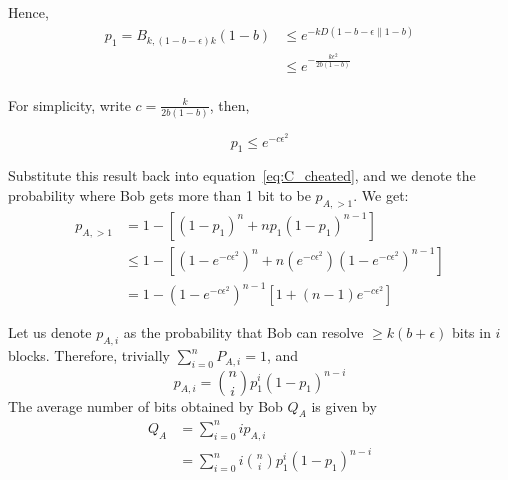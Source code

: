 \documentclass[%
 reprint,
superscriptaddress,
 amsmath,amssymb,
 aps,
]{revtex4-2}
\begin{document}
Hence, 
\begin{equation}
\begin{split}
p_1=B_{k, (1-b-\epsilon)k}(1-b)&\le e^{-kD\left(1-b-\epsilon\|1-b\right)}\\
&\le e^{-\frac{k\epsilon^2}{2b(1-b)}}\\
\end{split}
\end{equation}

For simplicity, write $c=\frac{k}{2b(1-b)}$, then,

\begin{equation}
    p_1\le  e^{-c\epsilon^2}
\end{equation}

Substitute this result back into equation~\ref{eq:C_cheated}, and we denote the probability where Bob gets more than 1 bit to be $p_{A, >1}$. We get:
\begin{equation}
    \begin{split}
        p_{A, >1} &=1-\left[(1-p_1)^n+np_1(1-p_1)^{n-1}\right]\\
        &\le 1-\left[(1-e^{-c\epsilon^2})^n+n(e^{-c\epsilon^2})(1-e^{-c\epsilon^2})^{n-1}\right]\\
        &=1-(1-e^{-c\epsilon^2})^{n-1}\left[1+(n-1)e^{-c\epsilon^2}\right]
    \end{split}
    \label{eq:upper_bound_C_cheated}
\end{equation}

Let us denote $p_{A,i}$ as the probability that Bob can resolve $\ge k(b+\epsilon)$ bits in $i$ blocks. Therefore, trivially $\sum_{i=0}^n P_{A, i}=1$, and 
\begin{equation}
    p_{A, i} = \binom{n}{i}p_1^i(1-p_1)^{n-i}
\end{equation}
The average number of bits obtained by Bob $Q_{A}$ is given by
\begin{equation}
\begin{split}
    Q_{A} &= \sum_{i=0}^n ip_{A, i}\\
    &=\sum_{i=0}^ni\binom{n}{i}p_1^i(1-p_1)^{n-i}
\end{split}
\end{equation}
\end{document}
